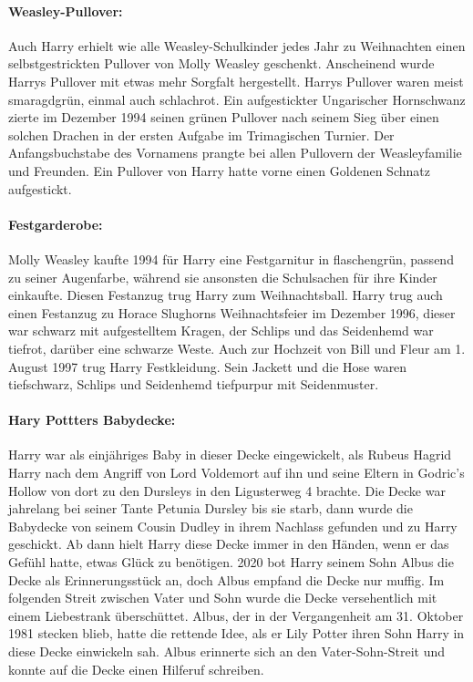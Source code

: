 \documentclass[a4paper, 10pt]{article}
\begin{document}
\paragraph{Weasley-Pullover:}
Auch Harry erhielt wie alle Weasley-Schulkinder jedes Jahr zu Weihnachten einen selbstgestrickten Pullover von Molly Weasley geschenkt. Anscheinend wurde Harrys Pullover mit etwas mehr Sorgfalt hergestellt. Harrys Pullover waren meist smaragdgrün, einmal auch schlachrot. Ein aufgestickter Ungarischer Hornschwanz zierte im Dezember 1994 seinen grünen Pullover nach seinem Sieg über einen solchen Drachen in der ersten Aufgabe im Trimagischen Turnier. Der Anfangsbuchstabe des Vornamens prangte bei allen Pullovern der Weasleyfamilie und Freunden. Ein Pullover von Harry hatte vorne einen Goldenen Schnatz aufgestickt.
\paragraph{Festgarderobe:}
Molly Weasley kaufte 1994 für Harry eine Festgarnitur in flaschengrün, passend zu seiner Augenfarbe, während sie ansonsten die Schulsachen für ihre Kinder einkaufte. Diesen Festanzug trug Harry zum Weihnachtsball. Harry trug auch einen Festanzug zu Horace Slughorns Weihnachtsfeier im Dezember 1996, dieser war schwarz mit aufgestelltem Kragen, der Schlips und das Seidenhemd war tiefrot, darüber eine schwarze Weste. Auch zur Hochzeit von Bill und Fleur am 1. August 1997 trug Harry Festkleidung. Sein Jackett und die Hose waren tiefschwarz, Schlips und Seidenhemd tiefpurpur mit Seidenmuster.
\paragraph{Hary Pottters Babydecke:}
Harry war als einjähriges Baby in dieser Decke eingewickelt, als Rubeus Hagrid Harry nach dem Angriff von Lord Voldemort auf ihn und seine Eltern in Godric's Hollow von dort zu den Dursleys in den Ligusterweg 4 brachte. Die Decke war jahrelang bei seiner Tante Petunia Dursley bis sie starb, dann wurde die Babydecke von seinem Cousin Dudley in ihrem Nachlass gefunden und zu Harry geschickt. Ab dann hielt Harry diese Decke immer in den Händen, wenn er das Gefühl hatte, etwas Glück zu benötigen. 2020 bot Harry seinem Sohn Albus die Decke als Erinnerungsstück an, doch Albus empfand die Decke nur muffig. Im folgenden Streit zwischen Vater und Sohn wurde die Decke versehentlich mit einem Liebestrank überschüttet. Albus, der in der Vergangenheit am 31. Oktober 1981 stecken blieb, hatte die rettende Idee, als er Lily Potter ihren Sohn Harry in diese Decke einwickeln sah. Albus erinnerte sich an den Vater-Sohn-Streit und konnte auf die Decke einen Hilferuf schreiben.
\end{document}
